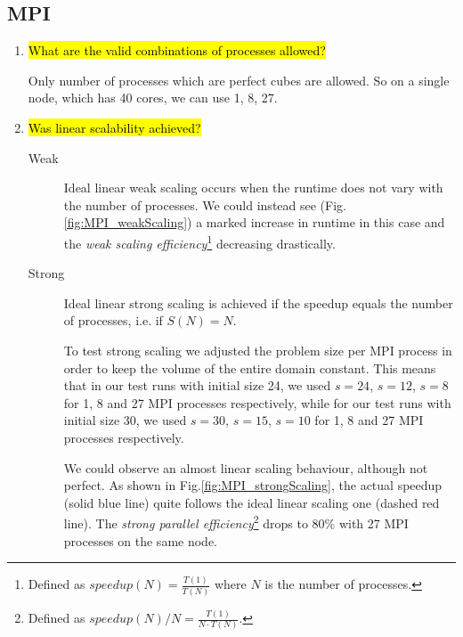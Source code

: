 \documentclass{article}
\begin{document}
\subsection{MPI}
\begin{enumerate}
	\item \hl{What are the valid combinations of processes allowed?}

	Only number of processes which are perfect cubes are allowed. So on a single node, which has 40 cores, we can use 1, 8, 27.

	\item \hl{Was linear scalability achieved?}


	\begin{description}
		\item[Weak]	 Ideal linear weak scaling occurs when the runtime does not vary with the number of processes. We could instead see (Fig.\ref{fig:MPI_weakScaling}) a marked increase in runtime in this case and the \emph{weak scaling efficiency}\footnote{Defined as $speedup(N) = \frac{T(1)}{T(N)}$ where $N$ is the number of processes.} decreasing drastically.

		\item[Strong]
		Ideal linear strong scaling is achieved if the speedup equals the number of processes, i.e. if $S(N) = N$.

		To test strong scaling we adjusted the problem size per MPI process in order to keep the volume of the entire domain constant. This means that in our test runs with initial size 24, we used $s=24$, $s=12$, $s=8$ for 1, 8 and 27 MPI processes respectively, while for our test runs with initial size 30, we used $s=30$, $s=15$, $s=10$ for 1, 8 and 27 MPI processes respectively.

		We could observe an almost linear scaling behaviour, although not perfect. As shown in Fig.\ref{fig:MPI_strongScaling}, the actual speedup (solid blue line) quite follows the ideal linear scaling one (dashed red line). The \emph{strong parallel efficiency}\footnote{Defined as $speedup(N)/N = \frac{T(1)}{N \cdot T(N)}$.} drops to $80\%$ with 27 MPI processes on the same node.


\end{description}
\end{enumerate}
\end{document}
